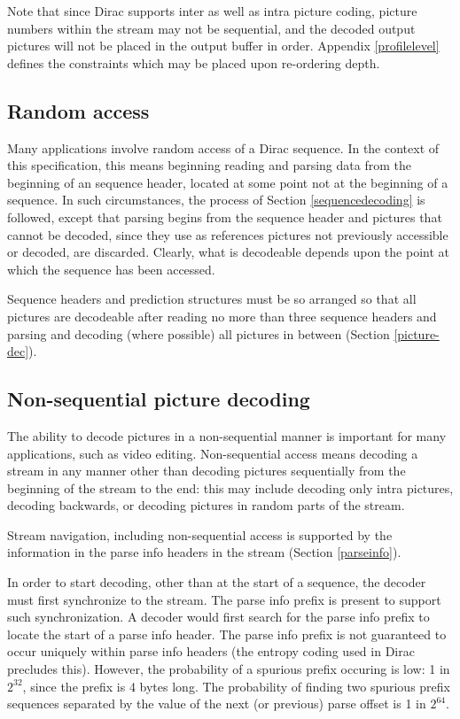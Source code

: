 Note that since Dirac supports inter as well as intra picture coding, picture numbers
within the stream may not be sequential, and the decoded output pictures will not be
placed in the output buffer in order. Appendix \ref{profilelevel} defines the constraints
which may be placed upon re-ordering depth.

\subsection{Random access}
\label{randomaccess}

Many applications involve random access of a Dirac sequence. In the context
 of this specification, this means beginning reading and parsing data from the 
beginning of an sequence header, located at some point not at the beginning
 of a sequence. In such circumstances, the process of Section 
\ref{sequencedecoding} is followed, except that parsing begins from the sequence header
 and pictures that cannot be decoded, since they use as references pictures not
 previously accessible or decoded, are discarded. Clearly, what is decodeable depends
 upon the point at which the sequence has been accessed.

Sequence headers and prediction structures must be so arranged so that all pictures
are decodeable after reading no more than three sequence headers and parsing and decoding (where possible) all pictures in between (Section \ref{picture-dec}).

\subsection{Non-sequential picture decoding}

The ability to decode pictures in a non-sequential manner is important for many
 applications, such as video editing. Non-sequential access means decoding a 
stream in any manner other than decoding pictures sequentially from the beginning 
of the stream to the end: this may include decoding only intra pictures, decoding backwards, or decoding pictures in random parts of the stream. 

Stream navigation, including non-sequential access is supported by the information 
in the parse info headers in the stream (Section \ref{parseinfo}). 

In order to start decoding, other than at the start of a sequence, the decoder 
must first synchronize to the stream. The parse info prefix is present to support such synchronization. A decoder would first search for the parse info prefix to locate 
the start of a parse info header. The parse info prefix is not guaranteed to occur
 uniquely within parse info headers (the entropy coding used in 
Dirac precludes this). However, the probability of a spurious 
prefix occuring is low: 1 in $2^{32}$, since the prefix is 4 bytes long. The probability of finding 
two spurious prefix sequences separated by the value of the next (or previous) parse 
offset is 1 in $2^{64}$.  

